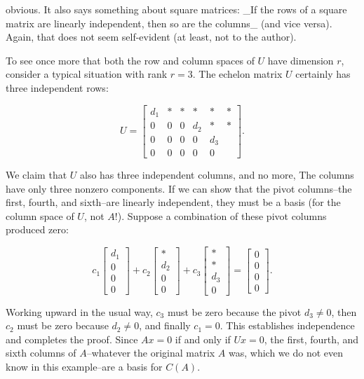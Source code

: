 obvious. It also says something about square matrices: _If the rows of a square matrix are linearly independent, then so are the columns_ (and vice versa). Again, that does not seem self-evident (at least, not to the author).

To see once more that both the row and column spaces of \(U\) have dimension \(r\), consider a typical situation with rank \(r=3\). The echelon matrix \(U\) certainly has three independent rows:

\[U=\left[\begin{array}{cccccc}d_{1}&*&*&*&*&*\\ \hline 0&0&0&d_{2}&*&*\\ 0&0&0&0&d_{3}\\ 0&0&0&0&0\end{array}\right].\]

We claim that \(U\) also has three independent columns, and no more, The columns have only three nonzero components. If we can show that the pivot columns--the first, fourth, and sixth--are linearly independent, they must be a basis (for the column space of \(U\), not \(A\)!). Suppose a combination of these pivot columns produced zero:

\[c_{1}\left[\begin{array}{c}d_{1}\\ 0\\ 0\\ 0\end{array}\right]+c_{2}\left[\begin{array}{c}*\\ d_{2}\\ 0\\ 0\end{array}\right]+c_{3}\left[\begin{array}{c}*\\ *\\ d_{3}\\ 0\end{array}\right]=\left[\begin{array}{c}0\\ 0\\ 0\\ 0\end{array}\right].\]

Working upward in the usual way, \(c_{3}\) must be zero because the pivot \(d_{3}\neq 0\), then \(c_{2}\) must be zero because \(d_{2}\neq 0\), and finally \(c_{1}=0\). This establishes independence and completes the proof. Since \(Ax=0\) if and only if \(Ux=0\), the first, fourth, and sixth columns of \(A\)--whatever the original matrix \(A\) was, which we do not even know in this example--are a basis for \(C(A)\).

